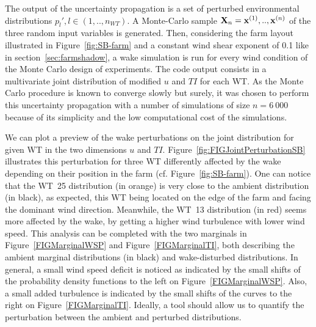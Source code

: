 The output of the uncertainty propagation is a set of perturbed environmental distributions $p_l',l \in (1,..,n_{WT})$.
A Monte-Carlo sample ${\bf X}_n={{\bf x}^{(1)},..,{\bf x}^{(n)}}$ of the three random input variables is generated. 
Then, considering the farm layout illustrated in Figure~\ref{fig:SB-farm} and a constant wind shear exponent of 0.1 like in section~\ref{sec:farmshadow}, a wake simulation is run for every wind condition of the Monte Carlo design of experiments. 
The code output consists in a multivariate joint distribution of modified $u$ and $TI$ for each WT. As the Monte Carlo procedure is known to converge slowly but surely, it was chosen to perform this uncertainty propagation with a number of simulations of size $n=6~000$ because of its simplicity and the low computational cost of the simulations.

 We can plot a preview of the wake perturbations on the joint distribution for given WT in the two dimensions $u$ and $TI$. 
 Figure~\ref{fig:FIGJointPerturbationSB} illustrates this perturbation for three WT differently affected by the wake depending on their position in the farm (cf. Figure~\ref{fig:SB-farm}). 
 One can notice that the WT~25 distribution (in orange) is very close to the ambient distribution (in black), as expected, this WT being located on the edge of the farm and facing the dominant wind direction. 
 Meanwhile, the WT~13 distribution (in red) seems more affected by the wake, by getting a higher wind turbulence with lower wind speed. 
 This analysis can be completed with the two marginals in Figure~\ref{FIGMarginalWSP} and Figure~\ref{FIGMarginalTI}, both describing the ambient marginal distributions (in black) and wake-disturbed distributions. 
 In general, a small wind speed deficit is noticed as indicated by the small shifts of the probability density functions to the left on Figure~\ref{FIGMarginalWSP}. 
 Also, a small added turbulence is indicated by the small shifts of the curves to the right on Figure~\ref{FIGMarginalTI}. 
 Ideally, a tool should allow us to quantify the perturbation between the ambient and perturbed distributions.

